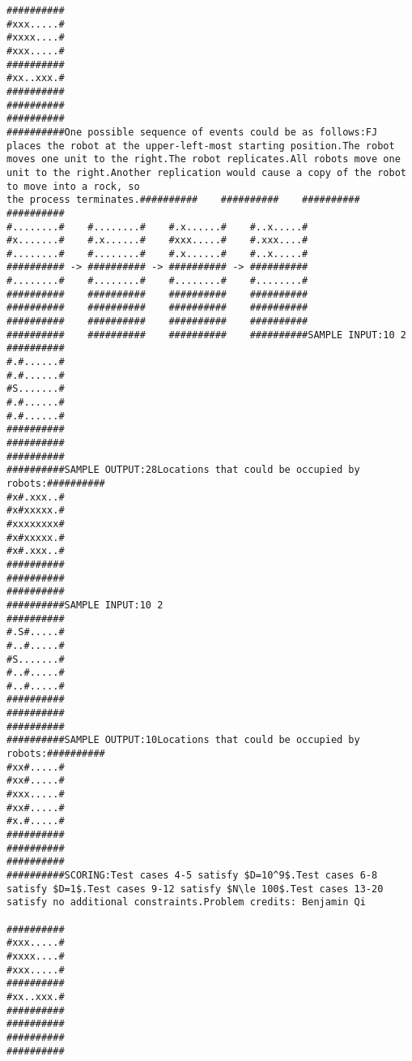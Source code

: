 \documentclass[12pt]{article}
\begin{document}
\begin{verbatim}
##########
#xxx.....#
#xxxx....#
#xxx.....#
##########
#xx..xxx.#
##########
##########
##########
##########One possible sequence of events could be as follows:FJ places the robot at the upper-left-most starting position.The robot moves one unit to the right.The robot replicates.All robots move one unit to the right.Another replication would cause a copy of the robot to move into a rock, so
the process terminates.##########    ##########    ##########    ##########
#........#    #........#    #.x......#    #..x.....#
#x.......#    #.x......#    #xxx.....#    #.xxx....#
#........#    #........#    #.x......#    #..x.....#
########## -> ########## -> ########## -> ##########
#........#    #........#    #........#    #........#
##########    ##########    ##########    ##########
##########    ##########    ##########    ##########
##########    ##########    ##########    ##########
##########    ##########    ##########    ##########SAMPLE INPUT:10 2
##########
#.#......#
#.#......#
#S.......#
#.#......#
#.#......#
##########
##########
##########
##########SAMPLE OUTPUT:28Locations that could be occupied by robots:##########
#x#.xxx..#
#x#xxxxx.#
#xxxxxxxx#
#x#xxxxx.#
#x#.xxx..#
##########
##########
##########
##########SAMPLE INPUT:10 2
##########
#.S#.....#
#..#.....#
#S.......#
#..#.....#
#..#.....#
##########
##########
##########
##########SAMPLE OUTPUT:10Locations that could be occupied by robots:##########
#xx#.....#
#xx#.....#
#xxx.....#
#xx#.....#
#x.#.....#
##########
##########
##########
##########SCORING:Test cases 4-5 satisfy $D=10^9$.Test cases 6-8 satisfy $D=1$.Test cases 9-12 satisfy $N\le 100$.Test cases 13-20 satisfy no additional constraints.Problem credits: Benjamin Qi

##########
#xxx.....#
#xxxx....#
#xxx.....#
##########
#xx..xxx.#
##########
##########
##########
##########


\end{verbatim}
\end{document}
